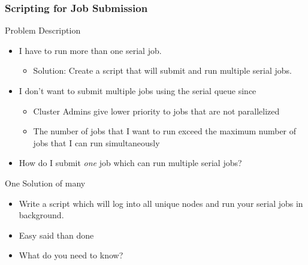 \documentclass[10pt,t]{beamer}
\begin{document}
\begin{frame}
  \frametitle{Scripting for Job Submission}
  \begin{block}{Problem Description}
    \begin{itemize}
      \item I have to run more than one serial job.
        \begin{itemize}
          \item Solution: Create a script that will submit and run multiple serial jobs.
        \end{itemize}
      \item I don't want to submit multiple jobs using the serial queue since
        \begin{itemize}
          \item Cluster Admins give lower priority to jobs that are not parallelized
          \item The number of jobs that I want to run exceed the maximum number of jobs that I can run simultaneously
        \end{itemize}
      \item How do I submit \emph{one} job which can run multiple serial jobs?
    \end{itemize}
  \end{block}
  \begin{exampleblock}{One Solution of many}
    \begin{itemize}
      \item Write a script which will log into all unique nodes and run your serial jobs in background.
      \item Easy said than done
      \item What do you need to know?
      \begin{enumerate}
        \fontsize{8}{7}
      \end{enumerate}
    \end{itemize}
  \end{exampleblock}
\end{frame}
\end{document}
